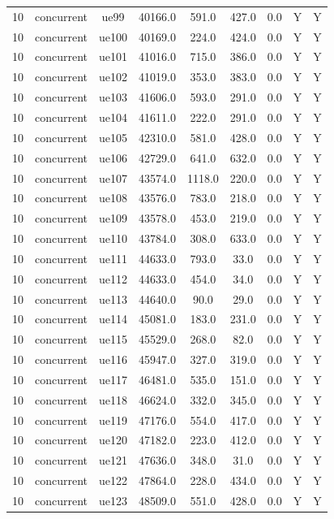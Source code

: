 \begin{table}[ht]
\begin{tabular}{|c|c|c|c|c|c|c|c|c|}
10 & concurrent & ue99 & 40166.0 & 591.0 & 427.0 & 0.0 & Y & Y \\
10 & concurrent & ue100 & 40169.0 & 224.0 & 424.0 & 0.0 & Y & Y \\
10 & concurrent & ue101 & 41016.0 & 715.0 & 386.0 & 0.0 & Y & Y \\
10 & concurrent & ue102 & 41019.0 & 353.0 & 383.0 & 0.0 & Y & Y \\
10 & concurrent & ue103 & 41606.0 & 593.0 & 291.0 & 0.0 & Y & Y \\
10 & concurrent & ue104 & 41611.0 & 222.0 & 291.0 & 0.0 & Y & Y \\
10 & concurrent & ue105 & 42310.0 & 581.0 & 428.0 & 0.0 & Y & Y \\
10 & concurrent & ue106 & 42729.0 & 641.0 & 632.0 & 0.0 & Y & Y \\
10 & concurrent & ue107 & 43574.0 & 1118.0 & 220.0 & 0.0 & Y & Y \\
10 & concurrent & ue108 & 43576.0 & 783.0 & 218.0 & 0.0 & Y & Y \\
10 & concurrent & ue109 & 43578.0 & 453.0 & 219.0 & 0.0 & Y & Y \\
10 & concurrent & ue110 & 43784.0 & 308.0 & 633.0 & 0.0 & Y & Y \\
10 & concurrent & ue111 & 44633.0 & 793.0 & 33.0 & 0.0 & Y & Y \\
10 & concurrent & ue112 & 44633.0 & 454.0 & 34.0 & 0.0 & Y & Y \\
10 & concurrent & ue113 & 44640.0 & 90.0 & 29.0 & 0.0 & Y & Y \\
10 & concurrent & ue114 & 45081.0 & 183.0 & 231.0 & 0.0 & Y & Y \\
10 & concurrent & ue115 & 45529.0 & 268.0 & 82.0 & 0.0 & Y & Y \\
10 & concurrent & ue116 & 45947.0 & 327.0 & 319.0 & 0.0 & Y & Y \\
10 & concurrent & ue117 & 46481.0 & 535.0 & 151.0 & 0.0 & Y & Y \\
10 & concurrent & ue118 & 46624.0 & 332.0 & 345.0 & 0.0 & Y & Y \\
10 & concurrent & ue119 & 47176.0 & 554.0 & 417.0 & 0.0 & Y & Y \\
10 & concurrent & ue120 & 47182.0 & 223.0 & 412.0 & 0.0 & Y & Y \\
10 & concurrent & ue121 & 47636.0 & 348.0 & 31.0 & 0.0 & Y & Y \\
10 & concurrent & ue122 & 47864.0 & 228.0 & 434.0 & 0.0 & Y & Y \\
10 & concurrent & ue123 & 48509.0 & 551.0 & 428.0 & 0.0 & Y & Y \\

\end{tabular}
\end{table}
